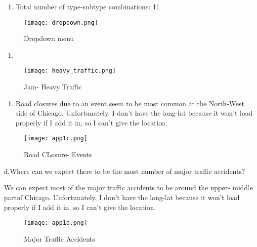\documentclass[
  letterpaper,
  DIV=11,
  numbers=noendperiod]{scrartcl}
\providecommand{\tightlist}{%
  \setlength{\itemsep}{0pt}\setlength{\parskip}{0pt}}\usepackage{longtable,booktabs,array}
\begin{document}
\begin{enumerate}
\def\labelenumi{\alph{enumi}.}
\tightlist
\item
  Total number of type-subtype combinations: 11
\end{enumerate}

\begin{figure}[H]

{\centering \texttt{[image: dropdown.png]}

}

\caption{Dropdown menu}

\end{figure}%

\begin{enumerate}
\def\labelenumi{\alph{enumi}.}
\setcounter{enumi}{1}
\tightlist
\item
\end{enumerate}

\begin{figure}[H]

{\centering \texttt{[image: heavy\_traffic.png]}

}

\caption{Jam- Heavy Traffic}

\end{figure}%

\begin{enumerate}
\def\labelenumi{\alph{enumi}.}
\setcounter{enumi}{2}
\tightlist
\item
  Road closures due to an event seem to be most common at the North-West
  side of Chicago. Unfortunately, I don't have the long-lat because it
  won't load properly if I add it in, so I can't give the location.
\end{enumerate}

\begin{figure}[H]

{\centering \texttt{[image: app1c.png]}

}

\caption{Road CLosure- Events}

\end{figure}%

d.Where can we expect there to be the most number of major traffic
accidents?

We can expect most of the major traffic accidents to be around the
upper- middle partof Chicago. Unfortunately, I don't have the long-lat
because it won't load properly if I add it in, so I can't give the
location.

\begin{figure}[H]

{\centering \texttt{[image: app1d.png]}

}

\caption{Major Traffic Accidents}

\end{figure}%
\end{document}
